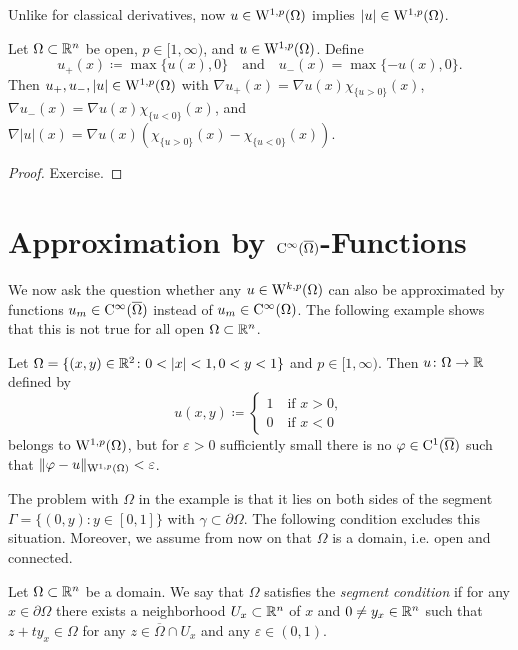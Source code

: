 Unlike for classical derivatives, now $u \in \mathrm{W}^{1,p}(\Omega)$ implies $|u| \in \mathrm{W}^{1,p}(\Omega)$.

\begin{cor}
  Let $\Omega \subset \mathbb{R}^n$ be open, $p \in [1,\infty)$, and $u \in \mathrm{W}^{1,p}(\Omega)$.
  Define 
  $$u_+(x) \coloneqq \max\{u(x),0\} \quad\text{and}\quad u_-(x) = \max\{-u(x),0\}.$$
  Then $u_+, u_-,|u| \in \mathrm{W}^{1,p}(\Omega)$ with
    $\nabla u_+(x) = \nabla u(x) \chi_{\{ u > 0\}}(x)$, $\nabla u_-(x) = \nabla u(x) \chi_{\{ u < 0\}}(x)$, and $\nabla|u|(x) = \nabla u(x) \left( \chi_{\{ u > 0\} } (x) - \chi_{\{u < 0\}} (x) \right)$.
\end{cor}

\begin{proof}
  Exercise.
\end{proof}

\section{Approximation by \texorpdfstring{$\mathrm{C}^\infty(\overline{\Omega})$}{C\textasciicircum infty(Omega) }-Functions}

We now ask the question whether any $u \in \mathrm{W}^{k,p}(\Omega)$ can also be approximated by functions $u_m \in \mathrm{C}^\infty(\overline\Omega)$ instead of $u_m \in \mathrm{C}^\infty(\Omega)$.
The following example shows that this is not true for all open $\Omega \subset \mathbb{R}^n$.

\begin{ex}
  Let $\Omega = \{(x,y) \in \mathbb{R}^2 \colon 0 < |x| < 1, 0 < y < 1\}$ and $p \in [1,\infty)$.
  Then $u \colon \Omega \to \mathbb{R}$ defined by
  $$
  u(x,y) \coloneqq \begin{cases} 1 \quad\text{if } x > 0,\\ 0 \quad\text{if } x < 0 \end{cases}
  $$
  belongs to $\mathrm{W}^{1,p}(\Omega)$, but for $\varepsilon > 0$ sufficiently small there is no $\varphi \in \mathrm{C}^1(\overline\Omega)$ such that $\|\varphi - u\|_{\mathrm{W}^{1,p}(\Omega)} < \varepsilon$.
\end{ex}

The problem with $\Omega$ in the example is that it lies on both sides of the segment $\Gamma = \{(0,y) \colon y \in [0,1]\}$ with $\gamma \subset \partial \Omega$.
The following condition excludes this situation.
Moreover, we assume from now on that $\Omega$ is a domain, i.e. open and connected.

\begin{defn}
  \label{defn:segmentCond}
  Let $\Omega \subset \mathbb{R}^n$ be a domain.
  We say that $\Omega$ satisfies the \emph{segment condition} if for any $x \in \partial\Omega$ there exists a neighborhood $U_x \subset \mathbb{R}^n$ of $x$ and $0 \neq y_x \in \mathbb{R}^n$ such that $z + t y_x \in \Omega$ for any $z \in \overline\Omega \cap U_x$ and any $\varepsilon \in (0,1)$.
\end{defn}

